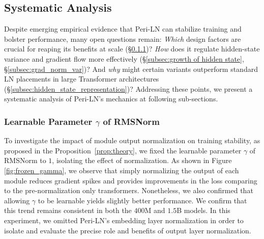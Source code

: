 \subsection{Systematic Analysis}
Despite emerging empirical evidence that Peri-LN can stabilize training and bolster performance, many open questions remain: \emph{Which} design factors are crucial for reaping its benefits at scale (\S\ref{subsec:frozengamma})? \emph{How} does it regulate hidden-state variance and gradient flow more effectively (\S\ref{subsec:growth of hidden state}, \S\ref{subsec:grad_norm_var})? And \emph{why} might certain variants outperform standard LN placements in large Transformer architectures (\S\ref{subsec:hidden_state_representation})? Addressing these points, we present a systematic analysis of Peri-LN’s mechanics at following sub-sections.


\subsubsection{Learnable Parameter $\gamma$ of RMSNorm} \label{subsec:frozengamma}
To investigate the impact of module output normalization on training stability, as proposed in the Proposition~\ref{prop:theory}, we fixed the learnable parameter $\gamma$ of RMSNorm to $1$, isolating the effect of normalization. As shown in Figure \ref{fig:frozen_gamma}, we observe that simply normalizing the output of each module reduces gradient spikes and provides improvements in the loss comparing to the pre-normalization only transformers. Nonetheless, we also confirmed that allowing $\gamma$ to be learnable yields slightly better performance. We confirm that this trend remains consistent in both the $400$M and $1.5$B models. In this experiment, we omitted Peri-LN's embedding layer normalization in order to isolate and evaluate the precise role and benefits of output layer normalization.

